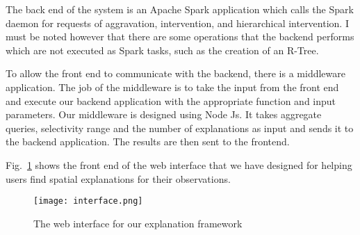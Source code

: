 The back end of the system is an Apache Spark application which calls the Spark daemon for requests of aggravation, intervention, and hierarchical intervention. I must be noted however that there are some operations that the backend performs which are not executed as Spark tasks, such as the creation of an R-Tree.

To allow the front end to communicate with the backend, there is a middleware application. The job of the middleware is to take the input from the front end and execute our backend application with the appropriate function and input parameters. Our middleware is designed using Node Js. It takes aggregate queries, selectivity range and the number of explanations as input and sends it to the backend application. The results are then sent to the frontend.

Fig.~\ref{fig:interface} shows the front end of the web interface that we have designed for helping users find spatial explanations for their observations.

\begin{figure}[h]
\texttt{[image: interface.png]}
\caption{The web interface for our explanation framework}
\label{fig:interface}
\end{figure}
